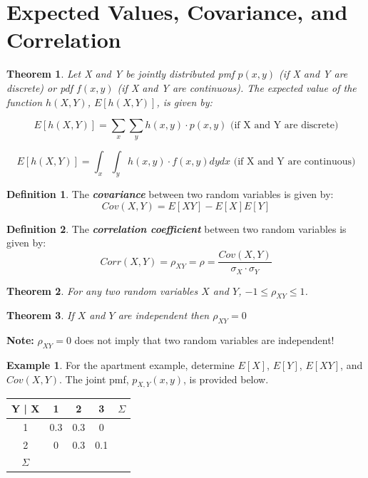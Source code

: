 \documentclass[
  11pt,
  oneside]{book}
\newtheorem{theorem}{Theorem}[chapter]
\theoremstyle{definition}
\newtheorem{definition}{Definition}[chapter]
\theoremstyle{definition}
\newtheorem{example}{Example}[chapter]
\theoremstyle{definition}
\theoremstyle{definition}
\theoremstyle{remark}
\begin{document}
\vfill \vfill

\newpage

\section{Expected Values, Covariance, and Correlation}\label{expected-values-covariance-and-correlation}

\begin{theorem}
Let X and Y be jointly distributed pmf \(p(x,y)\) (if X and Y are discrete) or pdf \(f(x,y)\) (if X and Y are continuous). The expected value of the function \(h(X,Y)\), \(E[h(X,Y)]\), is given by:

\[E[h(X,Y)] = \sum_x \sum_y h(x,y) \cdot p(x,y) \text{ (if X and Y are discrete)} \]

\[E[h(X,Y)] = \int_x \int_y h(x,y) \cdot f(x,y) dy dx \text{ (if X and Y are continuous)} \]
\end{theorem}

\begin{definition}
The \textbf{\emph{covariance}} between two random variables is given by: \[ Cov(X,Y) = E[XY] - E[X]E[Y]\]
\end{definition}

\begin{definition}
The \textbf{\emph{correlation coefficient}} between two random variables is given by: \[Corr(X,Y) = \rho_{XY} = \rho = \frac{Cov(X,Y)}{\sigma_X \cdot \sigma_Y}\]

\begin{theorem}
For any two random variables \(X\) and \(Y\), \(-1 \le \rho_{XY} \le 1\).
\end{theorem}

\begin{theorem}
If \(X\) and \(Y\) are independent then \(\rho_{XY} = 0\)
\end{theorem}

\textbf{Note:} \(\rho_{XY} = 0\) does not imply that two random variables are independent!
\end{definition}

\begin{example}
For the apartment example, determine \(E[X]\), \(E[Y]\), \(E[XY]\), and \(Cov(X,Y)\). The joint pmf, \(p_{X,Y}(x,y)\), is provided below.
\end{example}

\begin{table}[!h]
\centering
\begin{tabular}{c|c|c|c|c}
\hline
Y | X & 1 & 2 & 3 & $\Sigma$\\
\hline
1 & 0.3 & 0.3 & 0 & \\
\hline
2 & 0 & 0.3 & 0.1 & \\
\hline
$\Sigma$ &  &  &  & \\
\hline
\end{tabular}
\end{table}
\end{document}
